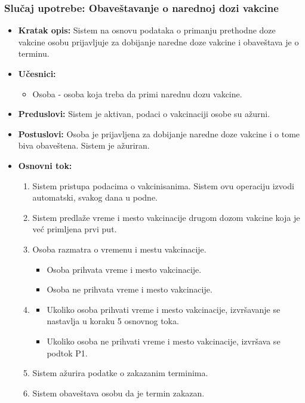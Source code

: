 \documentclass[titlepage]{article}
\begin{document}
\subsubsection{Slučaj upotrebe: Obaveštavanje o narednoj dozi vakcine}
\begin{itemize}
    \item \textbf{Kratak opis:} Sistem na osnovu podataka o primanju prethodne doze vakcine osobu prijavljuje za dobijanje naredne doze vakcine i obaveštava je o terminu.
    \item \textbf{Učesnici:} 
        \begin{itemize}
            \item Osoba - osoba koja treba da primi narednu dozu vakcine.
        \end{itemize}
    \item \textbf{Preduslovi:} Sistem je aktivan, podaci o vakcinaciji osobe su ažurni.
    \item \textbf{Postuslovi:} Osoba je prijavljena za dobijanje naredne doze vakcine i o tome biva obaveštena. Sistem je ažuriran.
    \item \textbf{Osnovni tok:}
    \begin{enumerate}
        \item Sistem pristupa podacima o vakcinisanima. Sistem ovu operaciju izvodi automatski, svakog dana u podne.
        \item Sistem predla\v{z}e vreme i mesto vakcinacije drugom dozom vakcine koja je već primljena prvi put.
        \item Osoba razmatra o vremenu i mestu vakcinacije.
        \begin{itemize}
            \item Osoba prihvata vreme i mesto vakcinacije.
            \item Osoba ne prihvata vreme i mesto vakcinacije.
        \end{itemize}
        \item 
        \begin{itemize}
            \item Ukoliko osoba prihvati vreme i mesto vakcinacije, izvršavanje se nastavlja u koraku 5 osnovnog toka.
            \item Ukoliko osoba ne prihvati vreme i mesto vakcinacije, izvršava se podtok P1.
        \end{itemize}
        \item Sistem a\v{z}urira podatke o zakazanim terminima.
        \item Sistem obave\v{s}tava osobu da je termin zakazan.
        

\end{enumerate}
\end{itemize}
\end{document}
